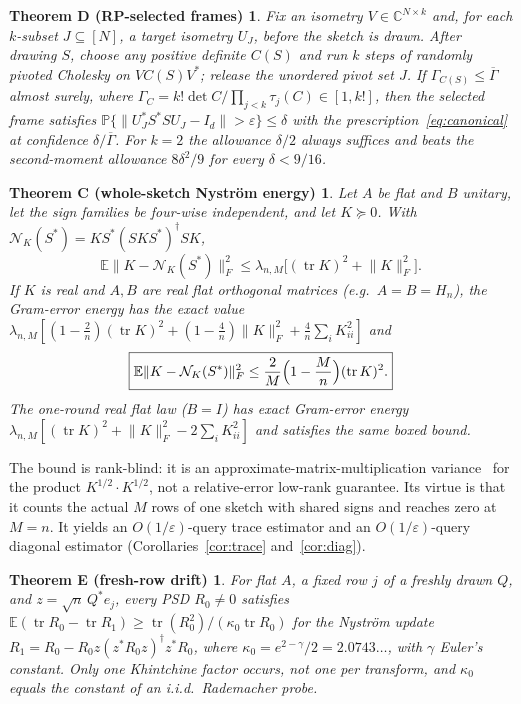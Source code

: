 \documentclass[11pt,a4paper]{article}
\newtheorem*{theoremC}{Theorem C (whole-sketch Nystr\"om energy)}
\newtheorem*{theoremD}{Theorem D (RP-selected frames)}
\newtheorem*{theoremE}{Theorem E (fresh-row drift)}
\theoremstyle{definition}
\theoremstyle{remark}
\numberwithin{equation}{section}
\newcommand{\E}{\mathbb E}
\newcommand{\Prob}{\mathbb P}
\newcommand{\C}{\mathbb C}
\newcommand{\tr}{\operatorname{tr}}
\newcommand{\eps}{\varepsilon}
\newcommand{\norm}[1]{\lVert#1\rVert}
\newcommand{\Nys}{\mathcal N}
\begin{document}
\begin{theoremD}
Fix an isometry $V\in\C^{N\times k}$ and, for each $k$-subset $J\subseteq[N]$,
a target isometry $U_J$, before the sketch is drawn. After drawing $S$, choose
any positive definite $C(S)$ and run $k$ steps of randomly pivoted Cholesky
on $VC(S)V^*$; release the unordered pivot set $J$. If
$\Gamma_{C(S)}\le\overline\Gamma$ almost surely, where
$\Gamma_C=k!\det C/\prod_{j<k}\tau_j(C)\in[1,k!]$, then the selected frame
satisfies $\Prob\{\norm{U_J^*S^*SU_J-I_d}>\eps\}\le\delta$ with the
prescription~\eqref{eq:canonical} at confidence $\delta/\overline\Gamma$.
For $k=2$ the allowance $\delta/2$ always suffices and beats the
second-moment allowance $8\delta^2/9$ for every $\delta<9/16$.
\end{theoremD}

\begin{theoremC}
Let $A$ be flat and $B$ unitary, let the sign families be four-wise
independent, and let $K\succeq0$. With
$\Nys_K(S^*)=KS^*(SKS^*)^\dagger SK$,
\[
 \E\norm{K-\Nys_K(S^*)}_F^2
 \le\lambda_{n,M}\bigl[(\tr K)^2+\norm K_F^2\bigr].
\]
If $K$ is real and $A,B$ are real flat orthogonal matrices (e.g.\ $A=B=H_n$),
the Gram-error energy has the exact value
$\lambda_{n,M}[(1-\tfrac2n)(\tr K)^2+(1-\tfrac4n)\norm K_F^2+\tfrac4n\sum_iK_{ii}^2]$
and
\[
 \boxed{\E\norm{K-\Nys_K(S^*)}_F^2\le\frac2M\Bigl(1-\frac Mn\Bigr)(\tr K)^2.}
\]
The one-round real flat law ($B=I$) has exact Gram-error energy
$\lambda_{n,M}[(\tr K)^2+\norm K_F^2-2\sum_iK_{ii}^2]$ and satisfies the same
boxed bound.
\end{theoremC}

The bound is rank-blind: it is an approximate-matrix-multiplication
variance~\cite{DKM} for the product $K^{1/2}\cdot K^{1/2}$, not a
relative-error low-rank guarantee. Its virtue is that it counts the actual
$M$ rows of one sketch with shared signs and reaches zero at $M=n$.
It yields an $O(1/\eps)$-query trace estimator and an $O(1/\eps)$-query
diagonal estimator (Corollaries~\ref{cor:trace} and~\ref{cor:diag}).

\begin{theoremE}
For flat $A$, a fixed row $j$ of a freshly drawn $Q$, and
$z=\sqrt n\,Q^*e_j$, every PSD $R_0\ne0$ satisfies
$\E(\tr R_0-\tr R_1)\ge\tr(R_0^2)/(\kappa_0\tr R_0)$ for the Nystr\"om update
$R_1=R_0-R_0z(z^*R_0z)^\dagger z^*R_0$, where
$\kappa_0=e^{2-\gamma}/2=2.0743\ldots$, with $\gamma$ Euler's constant. Only one Khintchine factor occurs,
not one per transform, and $\kappa_0$ equals the constant of an i.i.d.\
Rademacher probe.
\end{theoremE}
\end{document}
